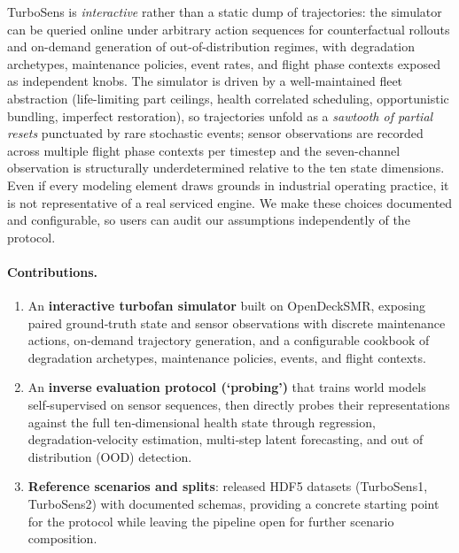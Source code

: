 \documentclass{article}
\begin{document}
TurboSens is \emph{interactive} rather than a static dump of trajectories: the simulator can be queried online under arbitrary action sequences for counterfactual rollouts and on-demand generation of out-of-distribution regimes, with degradation archetypes, maintenance policies, event rates, and flight phase contexts exposed as independent knobs. The simulator is driven by a well-maintained fleet abstraction (life-limiting part ceilings, health correlated scheduling, opportunistic bundling, imperfect restoration), so trajectories unfold as a \emph{sawtooth of partial resets} punctuated by rare stochastic events; sensor observations are recorded across multiple flight phase contexts per timestep and the seven-channel observation is structurally underdetermined relative to the ten state dimensions. Even if every modeling element draws grounds in industrial operating practice, it is not representative of a real serviced engine. We make these choices documented and configurable, so users can audit our assumptions independently of the protocol.

\paragraph{Contributions.}
\begin{enumerate}
    \item An \textbf{interactive turbofan simulator} built on OpenDeckSMR, exposing paired ground‑truth state and sensor observations with discrete maintenance actions, on‑demand trajectory generation, and a configurable cookbook of degradation archetypes, maintenance policies, events, and flight contexts.

    \item An \textbf{inverse evaluation protocol (`probing')} that trains world models self‑supervised on sensor sequences, then directly probes their representations against the full ten‑dimensional health state through regression, degradation‑velocity estimation, multi‑step latent forecasting, and out of distribution (OOD) detection.

    \item \textbf{Reference scenarios and splits}: released HDF5 datasets (TurboSens1, TurboSens2) with documented schemas, providing a concrete starting point for the protocol while leaving the pipeline open for further scenario composition.
\end{enumerate}
\end{document}

